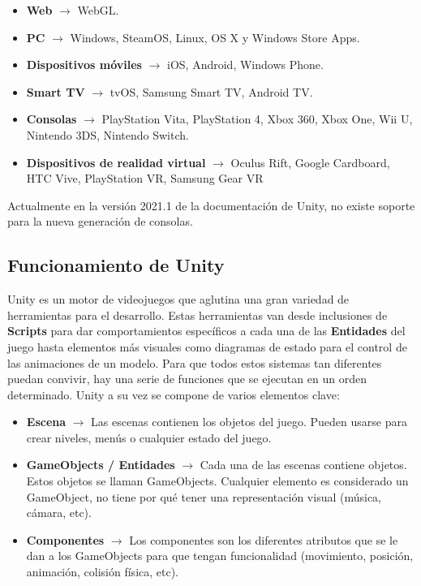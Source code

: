 \begin {itemize}
\item \textbf{Web} $\rightarrow$ WebGL.
\item \textbf{PC} $\rightarrow$ Windows, SteamOS, Linux, OS X y Windows Store Apps.
\item \textbf{Dispositivos m\'oviles} $\rightarrow$ iOS, Android, Windows Phone.
\item \textbf{Smart TV} $\rightarrow$ tvOS, Samsung Smart TV, Android TV.
\item \textbf{Consolas} $\rightarrow$ PlayStation Vita, PlayStation 4, Xbox 360, Xbox One, Wii U, Nintendo 3DS, Nintendo Switch.
\item \textbf{Dispositivos de realidad virtual} $\rightarrow$ Oculus Rift, Google Cardboard, HTC Vive, PlayStation VR, Samsung Gear VR
\end {itemize}

Actualmente en la versi\'on 2021.1 de la documentaci\'on de Unity, no existe soporte para la nueva generaci\'on de consolas.\\


\subsection {Funcionamiento de Unity}

Unity es un motor de videojuegos que aglutina una gran variedad de herramientas para el desarrollo. Estas herramientas van desde inclusiones de \textbf{Scripts} para dar comportamientos espec\'ificos a cada una de las \textbf{Entidades} del juego hasta elementos m\'as visuales como diagramas de estado para el control de las animaciones de un modelo. Para que todos estos sistemas tan diferentes puedan convivir, hay una serie de funciones que se ejecutan en un orden determinado. Unity a su vez se compone de varios elementos clave:

\begin {itemize}
\item \textbf{Escena} $\rightarrow$  Las escenas contienen los objetos del juego. Pueden usarse para crear niveles, men\'us o cualquier estado del juego.
\item \textbf{GameObjects / Entidades} $\rightarrow$ Cada una de las escenas contiene objetos. Estos objetos se llaman GameObjects. Cualquier elemento es considerado un GameObject, no tiene por qu\'e tener una representaci\'on visual (m\'usica, c\'amara, etc).
\item \textbf{Componentes} $\rightarrow$ Los componentes son los diferentes atributos que se le dan a los GameObjects para que tengan funcionalidad (movimiento, posici\'on, animaci\'on, colisi\'on f\'isica, etc).
\end {itemize}

